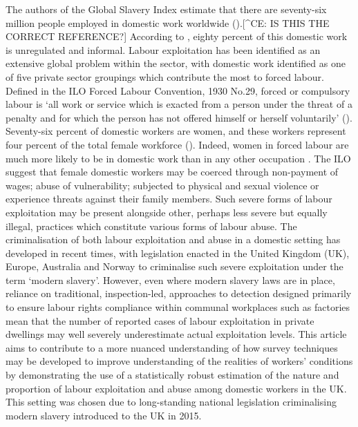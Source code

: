 \documentclass[
  12pt,
]{article}
\theoremstyle{plain}
\theoremstyle{definition}
\begin{document}
The authors of the Global Slavery Index estimate that there are
seventy-six million people employed in domestic work worldwide
(\textcite{international_labour_organization_global_2022}).{[}\^{}CE: IS
THIS THE CORRECT REFERENCE?{]} According to
\textcite{bonnet_domestic_2022}, eighty percent of this domestic work is
unregulated and informal. Labour exploitation has been identified as an
extensive global problem within the sector, with domestic work
identified as one of five private sector groupings which contribute the
most to forced labour. Defined in the ILO Forced Labour Convention, 1930
No.29, forced or compulsory labour is `all work or service which is
exacted from a person under the threat of a penalty and for which the
person has not offered himself or herself voluntarily'
(\textcite{international_labour_organization_global_2022}). Seventy-six
percent of domestic workers are women, and these workers represent four
percent of the total female workforce
(\textcite{international_labour_organization_global_2022}). Indeed,
women in forced labour are much more likely to be in domestic work than
in any other occupation
\autocite{international_labour_organization_global_2022}. The ILO
suggest that female domestic workers may be coerced through non-payment
of wages; abuse of vulnerability; subjected to physical and sexual
violence or experience threats against their family members. Such severe
forms of labour exploitation may be present alongside other, perhaps
less severe but equally illegal, practices which constitute various
forms of labour abuse. The criminalisation of both labour exploitation
and abuse in a domestic setting has developed in recent times, with
legislation enacted in the United Kingdom (UK), Europe, Australia and
Norway to criminalise such severe exploitation under the term `modern
slavery'. However, even where modern slavery laws are in place, reliance
on traditional, inspection-led, approaches to detection designed
primarily to ensure labour rights compliance within communal workplaces
such as factories mean that the number of reported cases of labour
exploitation in private dwellings may well severely underestimate actual
exploitation levels. This article aims to contribute to a more nuanced
understanding of how survey techniques may be developed to improve
understanding of the realities of workers' conditions by demonstrating
the use of a statistically robust estimation of the nature and
proportion of labour exploitation and abuse among domestic workers in
the UK. This setting was chosen due to long-standing national
legislation criminalising modern slavery introduced to the UK in 2015.
\end{document}
